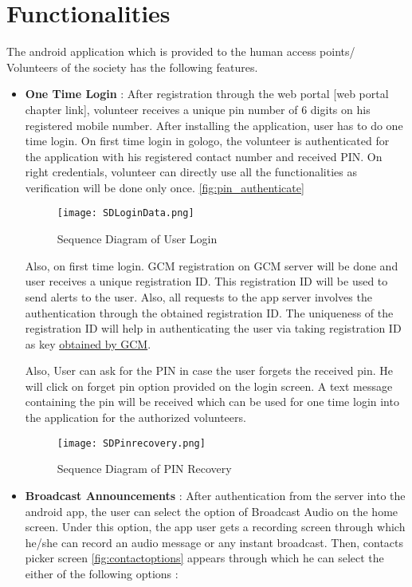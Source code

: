\section{Functionalities}
The android application which is provided to the human access points/ Volunteers of the society has the following features.
\begin{itemize}
\item \textbf{One Time Login} : After registration through the web portal [web portal chapter link], volunteer receives a unique pin number of 6 digits on his registered mobile number. After installing the application, user has to do one time login. On first time login in gologo, the volunteer is authenticated for the application with his registered contact number and received PIN. On right credentials, volunteer can directly use all the functionalities as verification will be done only once. 
\ref{fig:pin_authenticate}


\begin{figure}[H]
    \centering
	\texttt{[image: SDLoginData.png]}
    \caption{ Sequence Diagram of User Login }
    \label{fig:Sequence Diagram of User Login}
\end{figure}

Also, on first time login. GCM registration on GCM server will be done and user receives a unique registration ID. This registration ID will be used to send alerts to the user. Also, all requests to the app server involves the authentication through the obtained registration ID. The uniqueness of the registration ID will help in authenticating the user via taking registration ID as key \hyperref[gcmlink]{obtained by GCM}. 

Also, User can ask for the PIN in case the user forgets the received pin. He will click on forget pin option provided on the login screen. A text message containing the pin will be received which can be used for one time login into the application for the authorized volunteers.

\begin{figure}[H]
    \centering
	\texttt{[image: SDPinrecovery.png]}
    \caption{ Sequence Diagram of PIN Recovery}
    \label{fig:Sequence Diagram of PIN Recovery}
\end{figure}


\item \textbf{Broadcast Announcements} : After authentication from the server into the android app, the user can select the option of Broadcast Audio on the home screen. Under this option, the app user gets a recording screen through which he/she can record an audio message or any instant broadcast. Then, contacts picker screen \ref{fig:contactoptions} appears through which he can select the either of the following options :


\end{itemize}

